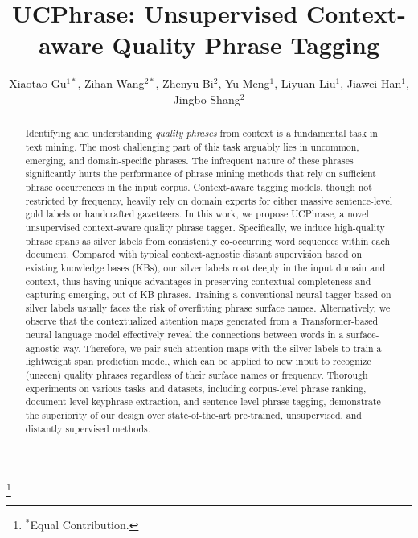 \documentclass[sigconf]{acmart}
\newcommand{\our}{\mbox{UCPhrase}\xspace}
\begin{document}

\title{\our: Unsupervised Context-aware Quality Phrase Tagging}

\author{Xiaotao Gu$^{1*}$, Zihan Wang$^{2*}$, Zhenyu Bi$^{2}$, Yu Meng$^1$, Liyuan Liu$^1$, Jiawei Han$^1$, Jingbo Shang$^2$}
\renewcommand{\shortauthors}{Xiaotao Gu and Zihan Wang, et al.}

\thanks{$^*$Equal Contribution.}
\begin{abstract}
Identifying and understanding \emph{quality phrases} from context is a fundamental task in text mining.  
The most challenging part of this task arguably lies in uncommon, emerging, and domain-specific phrases. 
The infrequent nature of these phrases significantly hurts the performance of phrase mining methods that rely on sufficient phrase occurrences in the input corpus.
Context-aware tagging models, though not restricted by frequency, heavily rely on domain experts for either massive sentence-level gold labels or handcrafted gazetteers.
In this work, we propose \our, a novel unsupervised context-aware quality phrase tagger.
Specifically, we induce high-quality phrase spans as silver labels from consistently co-occurring
word sequences within each document.
Compared with typical context-agnostic distant supervision based on existing knowledge bases (KBs), our silver labels root deeply in the input domain and context, thus having unique advantages in preserving
contextual completeness 
and capturing emerging, out-of-KB phrases.
Training a conventional neural tagger based on silver labels usually faces the risk of overfitting phrase surface names.
Alternatively, we observe that the contextualized attention maps generated from a Transformer-based neural language model effectively reveal the connections between words in a surface-agnostic way.
Therefore, we pair such attention maps with the silver labels to train a lightweight span prediction model, which can be applied to new input to recognize (unseen) quality phrases regardless of their surface names or frequency. 
Thorough experiments on various tasks and datasets, including corpus-level phrase ranking, document-level keyphrase extraction, and sentence-level phrase tagging, demonstrate the superiority of our design over state-of-the-art pre-trained, unsupervised, and distantly supervised methods.
 \end{abstract}
\end{document}
